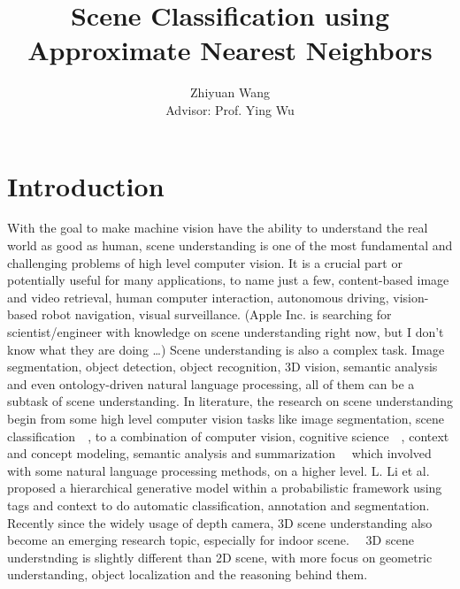 \documentclass[12pt]{article}
\title{Scene Classification using Approximate Nearest Neighbors}
\author{Zhiyuan Wang \\Advisor: Prof. Ying Wu}
\begin{document}
\maketitle
\section{Introduction}
With the goal to make machine vision have the ability to understand the real world as good as human, scene understanding is one of the most fundamental and challenging problems of high level computer vision. It is a crucial part or potentially useful for many applications, to name just a few, content-based image and video retrieval, human computer interaction, autonomous driving, vision-based robot navigation, visual surveillance. (Apple Inc. is searching for scientist/engineer with knowledge on scene understanding right now, but I don't know what they are doing \ldots) Scene understanding is also a complex task. Image segmentation, object detection, object recognition, 3D vision, semantic analysis and even ontology-driven natural language processing, all of them can be a subtask of scene understanding. In literature, the research on scene understanding begin from some high level computer vision tasks like image segmentation, scene classification~~\citep{oliva2001modeling, xiao2010sun}, to a combination of computer vision, cognitive science~~\citep{walther2011simple, oliva2006building}, context and concept modeling, semantic analysis and summarization~~\citep{zitnickadopting, li2009towards} which involved with some natural language processing methods, on a higher level. L. Li et al. proposed a hierarchical generative model within a probabilistic framework using tags and context to do automatic classification, annotation and segmentation.~~\citep{li2009towards} Recently since the widely usage of depth camera, 3D scene understanding also become an emerging research topic, especially for indoor scene.~~\citep{lin2013holistic, delaitre2012,SilbermanCoverage:ECCV14} 3D scene understnding is slightly different than 2D scene, with more focus on geometric understanding, object localization and the reasoning behind them. 
\end{document}
